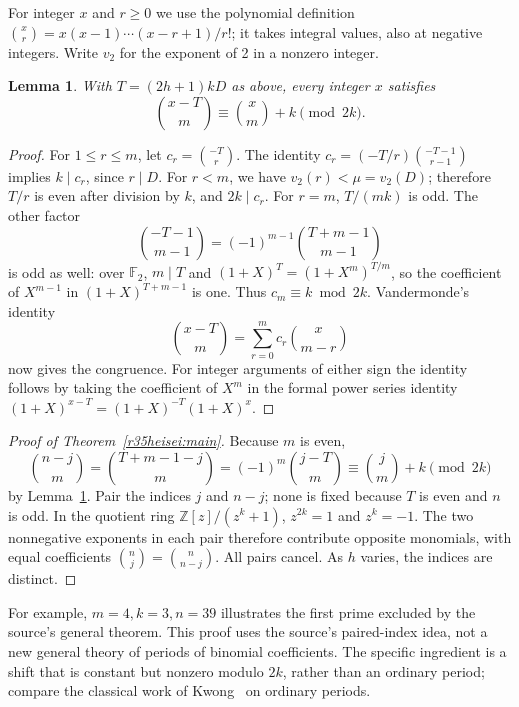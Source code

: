 \documentclass[11pt,a4paper]{article}
\numberwithin{equation}{section}
\newtheorem{lemma}[theorem]{Lemma}
\theoremstyle{definition}
\theoremstyle{remark}
\begin{document}
For integer \(x\) and \(r\ge0\) we use the polynomial definition
\(\binom xr=x(x-1)\cdots(x-r+1)/r!\); it takes integral values,
also at negative integers. Write \(v_2\) for the exponent of 2 in a
nonzero integer.
\begin{lemma}\label{r35heisei:shift}
With \(T=(2h+1)kD\) as above, every integer \(x\) satisfies
\[
 \binom{x-T}{m}\equiv\binom xm+k\pmod {2k}.
\]
\end{lemma}
\begin{proof}
For \(1\le r\le m\), let \(c_r=\binom{-T}{r}\).
The identity \(c_r=(-T/r)\binom{-T-1}{r-1}\) implies \(k\mid c_r\),
since \(r\mid D\). For \(r<m\), we have \(v_2(r)<\mu=v_2(D)\);
therefore \(T/r\) is even after division by \(k\), and \(2k\mid c_r\).
For \(r=m\), \(T/(mk)\) is odd. The other factor
\[
 \binom{-T-1}{m-1}=(-1)^{m-1}\binom{T+m-1}{m-1}
\]
is odd as well: over \(\mathbb F_2\), \(m\mid T\) and
\((1+X)^T=(1+X^m)^{T/m}\), so the coefficient of \(X^{m-1}\) in
\((1+X)^{T+m-1}\) is one. Thus \(c_m\equiv k\bmod 2k\).
Vandermonde's identity
\[
 \binom{x-T}{m}=\sum_{r=0}^m c_r\binom{x}{m-r}
\]
now gives the congruence. For integer arguments of either sign the
identity follows by taking the coefficient of \(X^m\) in the formal power
series identity \((1+X)^{x-T}=(1+X)^{-T}(1+X)^x\).
\end{proof}

\begin{proof}[Proof of Theorem~\ref{r35heisei:main}]
Because \(m\) is even,
\[
 \binom{n-j}{m}=\binom{T+m-1-j}{m}
               =(-1)^m\binom{j-T}{m}
               \equiv \binom jm+k\pmod{2k}
\]
by Lemma~\ref{r35heisei:shift}. Pair the indices \(j\) and \(n-j\); none is
fixed because \(T\) is even and \(n\) is odd. In the quotient ring
\(\mathbb Z[z]/(z^k+1)\), \(z^{2k}=1\) and \(z^k=-1\).
The two nonnegative exponents in each pair therefore contribute opposite
monomials, with equal coefficients \(\binom nj=\binom n{n-j}\).
All pairs cancel. As \(h\) varies, the indices are distinct.
\end{proof}
For example, \(m=4,k=3,n=39\) illustrates the first prime excluded
by the source's general theorem. This proof uses the source's paired-index
idea, not a new general theory of periods of binomial coefficients.
The specific ingredient is a shift that is constant but nonzero modulo
\(2k\), rather than an ordinary period; compare the classical work of
Kwong~\cite{r35heisei:KW} on ordinary periods.
\end{document}
